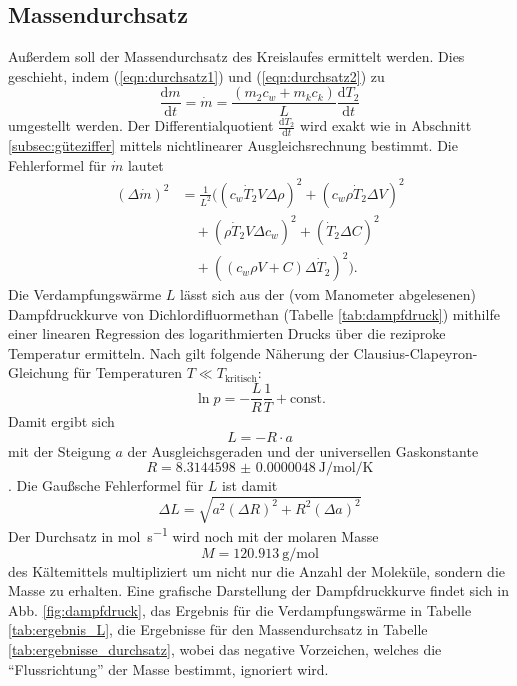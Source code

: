 \newpage
\subsection{Massendurchsatz}
  Außerdem soll der Massendurchsatz des Kreislaufes ermittelt werden. Dies geschieht, indem (\ref{eqn:durchsatz1}) und (\ref{eqn:durchsatz2}) zu
  \begin{equation}
    \frac{\mathrm{d}m}{\mathrm{d}t} = \dot m = \frac{(m_{2} c_w + m_k c_k)}{L}\frac {\mathrm{d}T_{2}}{\mathrm{d}t}
  \end{equation}
  umgestellt werden. Der Differentialquotient $\frac {\mathrm{d}T_{2}}{\mathrm{d}t}$ wird exakt wie in Abschnitt \ref{subsec:güteziffer} mittels nichtlinearer Ausgleichsrechnung bestimmt. Die Fehlerformel für $\dot m$ lautet
  \begin{align}
    (\Delta \dot m)^2 &= \frac{1}{L^2}((c_w \dot{T}_2 V \Delta \rho)^2 + (c_w \rho \dot{T}_2 \Delta V)^2 \\
    &\quad + (\rho \dot{T}_2 V \Delta c_w)^2 + (\dot{T}_2 \Delta C)^2 \\ &\quad + ((c_w \rho V + C) \Delta \dot{T}_2)^2).
  \end{align}
  Die Verdampfungswärme $L$ lässt sich aus der (vom Manometer abgelesenen) Dampfdruckkurve von Dichlordifluormethan (Tabelle \ref{tab:dampfdruck}) mithilfe einer linearen Regression des logarithmierten Drucks über die reziproke Temperatur ermitteln. Nach \cite{anleitung203} gilt folgende Näherung der Clausius-Clapeyron-Gleichung für Temperaturen $T \ll T_\mathrm{kritisch}$:
  \begin{equation}
    \ln p = -\frac{L}{R} \frac {1}{T} + \mathrm{const.}
  \end{equation}
  Damit ergibt sich
  \begin{equation}
    L = -R \cdot a
  \end{equation}
  mit der Steigung $a$ der Ausgleichsgeraden und der universellen Gaskonstante
  \begin{equation}
    R = \SI[separate-uncertainty=false]{8.3144598(48)}{\joule\per\mol\per\kelvin}
  \end{equation}
  \cite{codata}. Die Gaußsche Fehlerformel für $L$ ist damit
  \begin{equation}
    \Delta L = \sqrt{a^2 (\Delta R)^2 + R^2 (\Delta a)^2}
  \end{equation}
  Der Durchsatz in \si{\mol\per\second} wird noch mit der molaren Masse
  \begin{equation}
    M = \SI{120.913}{\gram\per\mol}
  \end{equation}
  \cite[267]{gase} des Kältemittels multipliziert um nicht nur die Anzahl der Moleküle, sondern die Masse zu erhalten. Eine grafische Darstellung der Dampfdruckkurve findet sich in Abb. \ref {fig:dampfdruck}, das Ergebnis für die Verdampfungswärme in Tabelle \ref{tab:ergebnis_L}, die Ergebnisse für den Massendurchsatz in Tabelle \ref{tab:ergebnisse_durchsatz}, wobei das negative Vorzeichen, welches die \enquote{Flussrichtung} der Masse bestimmt, ignoriert wird.

